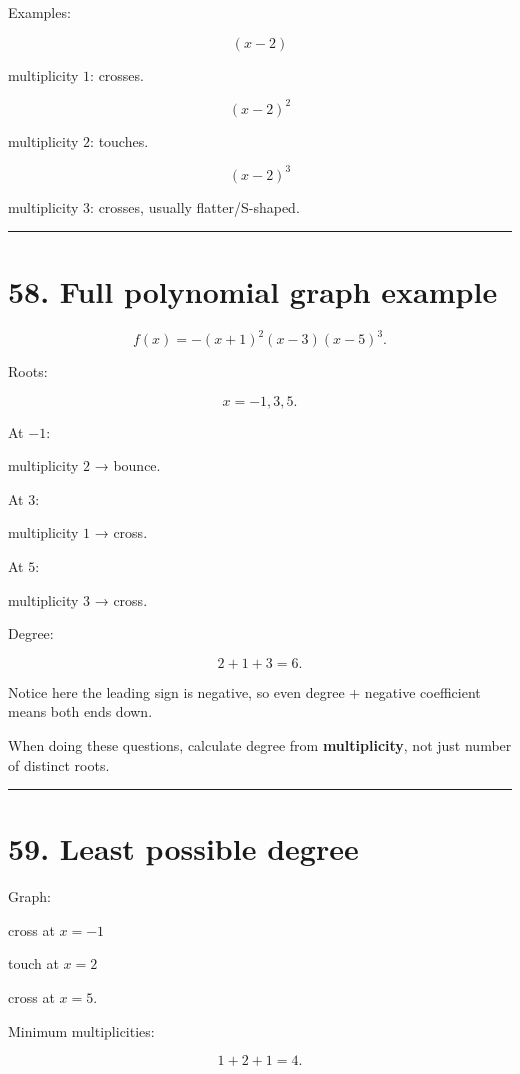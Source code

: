 \documentclass[
]{article}
\begin{document}
Examples:

\[
(x-2)
\]

multiplicity \(1\): crosses.

\[
(x-2)^2
\]

multiplicity \(2\): touches.

\[
(x-2)^3
\]

multiplicity \(3\): crosses, usually flatter/S-shaped.

\begin{center}\rule{0.5\linewidth}{0.5pt}\end{center}

\section{58. Full polynomial graph
example}\label{full-polynomial-graph-example}

\[
f(x)=-(x+1)^2(x-3)(x-5)^3.
\]

Roots:

\[
x=-1,3,5.
\]

At \(-1\):

multiplicity \(2\) → bounce.

At \(3\):

multiplicity \(1\) → cross.

At \(5\):

multiplicity \(3\) → cross.

Degree:

\[
2+1+3=6.
\]

Notice here the leading sign is negative, so even degree + negative
coefficient means both ends down.

When doing these questions, calculate degree from \textbf{multiplicity},
not just number of distinct roots.

\begin{center}\rule{0.5\linewidth}{0.5pt}\end{center}

\section{59. Least possible degree}\label{least-possible-degree}

Graph:

cross at \(x=-1\)

touch at \(x=2\)

cross at \(x=5\).

Minimum multiplicities:

\[
1+2+1=4.
\]
\end{document}
